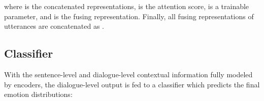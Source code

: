 \documentclass[letterpaper]{article} \usepackage{aaai21}  \usepackage{times}  \usepackage{helvet} \usepackage{courier}  \usepackage[hyphens]{url}  \usepackage{graphicx} \urlstyle{rm} \def\UrlFont{\rm}  \usepackage{natbib}  \usepackage{caption} \usepackage{multirow}
\begin{document}
where  is the concatenated representations,  is the attention score,  is a trainable parameter, and  is the fusing representation. Finally, all fusing representations of utterances are concatenated as . 

\begin{table}[]
\centering
{}
\caption{Statistics about IEMOCAP and MELD. }
\label{tab:dataset}
\end{table}

\subsection{Classifier}

With the sentence-level and dialogue-level contextual information fully modeled by encoders, the dialogue-level output is fed to a classifier which predicts the final emotion distributions: 
\end{document}

